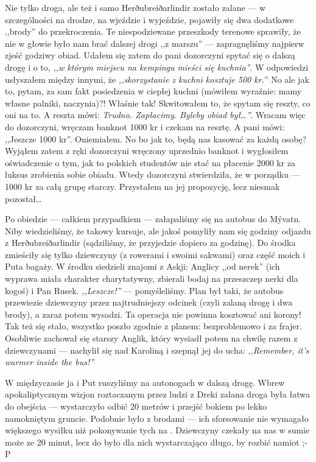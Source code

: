 Nie tylko droga, ale też i samo Herðubreiðarlindir zostało zalane --- w szczególności na drodze, na wjeździe i wyjeździe, pojawiły się dwa dodatkowe ,,brody'' do przekroczenia. Te niespodziewane przeszkody terenowe sprawiły, że nie w głowie było nam brać dalszej drogi ,,z marszu'' --- zapragnęliśmy najpierw zjeść godziwy obiad. Udałem się zatem do pani dozorczyni spytać się o dalszą drogę i o to, \emph{,,w którym miejscu na kempingu mieści się kuchnia''}. W odpowiedzi usłyszałem między innymi, że \emph{,,skorzystanie z kuchni kosztuje 500 kr.}'' No ale jak to, pytam, za sam fakt posiedzenia w ciepłej kuchni (mówiłem wyraźnie: mamy własne palniki, naczynia)?! Właśnie tak! Skwitowałem to, że spytam się reszty, co oni na to. A reszta mówi: \emph{Trudno. Zapłacimy. Byleby obiad był…''}. Wracam więc do dozorczyni, wręczam banknot 1000 kr i czekam na resztę. A pani mówi: ,,Jeszcze 1000 kr''. Oniemiałem. No bo jak to, będą nas kasować za każdą osobę? Wyjąłem zatem z ręki dozorczyni wręczony uprzednio banknot i wygłosiłem oświadczenie o tym, jak to polskich studentów nie stać na płacenie 2000 kr za luksus zrobienia sobie obiadu. Wtedy dozorczyni stwierdziła, że w porządku --- 1000 kr za całą grupę starczy. Przystałem na jej propozycję, lecz niesmak pozostał…

Po obiedzie --- całkiem przypadkiem --- załapaliśmy się na autobus do Mývatn. Niby wiedzieliśmy, że takowy kursuje, ale jakoś pomyliły nam się godziny odjazdu z Herðubreiðarlindir (sądziliśmy, że przyjedzie dopiero za godzinę). Do środka zmieściły się tylko dziewczyny (z rowerami i swoimi sakwami) oraz część moich i Puta bagaży. W środku siedzieli znajomi z Askji: Anglicy ,,od nerek'' (ich wyprawa miała charakter charytatywny, zbierali bodaj na przeszczep nerki dla kogoś) i Pan Rusek. \emph{,,Leszcze!''} --- pomyśleliśmy. Plan był taki, że autobus przewiezie dziewczyny przez najtrudniejszy odcinek (czyli zalaną drogę i dwa brody), a zaraz potem wysadzi. Ta operacja nie powinna kosztować ani korony! Tak też się stało, wszystko poszło zgodnie z planem: bezproblemowo i za frajer. Osobliwie zachował się starszy Anglik, który wysiadł potem na chwilę razem z dziewczynami --- nachylił się nad Karoliną i szepnął jej do ucha: \emph{,,Remember, it’s warmer inside the bus!''}

W międzyczasie ja i Put ruszyliśmy na autonogach w dalszą drogę. Wbrew apokaliptycznym wizjon roztaczanym przez ludzi z Dreki zalana droga była łatwa do obejścia --- wystarczyło odbić 20 metrów i przejść bokiem po lekko namokniętym gruncie. Podobnie było z brodami --- ich sforsowanie nie wymagało większego wysiłku niż pokonywanie tych na . Dziewczyny czekały na nas w sumie może ze 20 minut, lecz do było dla nich wystarczająco długo, by rozbić namiot ;-P

